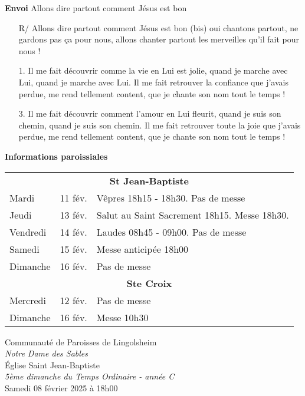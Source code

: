 \documentclass[10pt,a4paper]{article}
\newcommand{\HorRule}[1]{\noindent\rule{\linewidth}{#1}} %
\newcommand{\JournalName}[1]{%
		\begin{center}	
            \Large \usefont{T1}{augie}{m}{n}
			#1%
		\end{center}	
		\par \normalsize \normalfont}
\newcommand{\NewsItem}[1]{%
\vspace{4pt}
		\large \textbf{#1} \vspace{4pt}
        \normalsize \normalfont}
\begin{document}
\newpage

\NewsItem{Envoi} Allons dire partout comment Jésus est bon
\begin{itemize}
    \item [R/] Allons dire partout comment Jésus est bon (bis) oui chantons partout, ne gardons 
     pas ça pour nous, allons chanter partout les merveilles qu’il fait pour nous !
\item[1.]  Il me fait découvrir comme la vie en Lui est jolie, quand je marche avec Lui, quand je marche 
     avec Lui. Il me fait retrouver la confiance que j’avais perdue, me rend tellement content,  
     que je chante son nom tout le temps !
\item[3.] Il me fait découvrir comment l’amour en Lui fleurit, quand je suis son chemin, quand je suis 
     son chemin. Il me fait retrouver toute la joie que j’avais perdue, me rend tellement content,  
     que je chante son nom tout le temps !
     \end{itemize}

     \NewsItem{Informations paroissiales}
             
         \begin{tabular}{l l l}
         \multicolumn{3}{c}{\textbf{St Jean-Baptiste}} \\
  Mardi & 11 fév. & Vêpres 18h15 - 18h30. Pas de messe \\
Jeudi & 13 fév. & Salut au Saint Sacrement 18h15. Messe 18h30. \\
    Vendredi & 14 fév. & Laudes 08h45 - 09h00. Pas de messe \\
        Samedi  & 15 fév. & Messe anticipée 18h00 \\
    Dimanche & 16 fév. & Pas de messe \\      
      
         \multicolumn{3}{c}{\textbf{Ste Croix}} \\
         Mercredi & 12 fév. & Pas de messe \\ 
         Dimanche & 16 fév.& Messe 10h30 \\
    
        \end{tabular}
  

\newpage

\JournalName{Communauté de Paroisses de Lingolsheim \\
\normalsize \textit{Notre Dame des Sables}
\\ \large \'{E}glise Saint Jean-Baptiste
\\  \normalsize \textit{5ème dimanche du Temps Ordinaire - année C}
\\ \large Samedi 08 février 2025 à 18h00}
\end{document}
